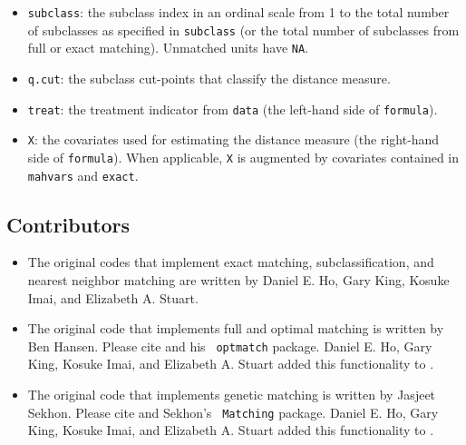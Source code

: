 \begin{itemize}
\item \texttt{subclass}: the subclass index in an ordinal
  scale from 1 to the total number of subclasses as specified in
  \texttt{subclass} (or the total number of subclasses from full or
  exact matching).  Unmatched units have \texttt{NA}.
  
\item \texttt{q.cut}: the subclass cut-points that classify the
  distance measure.
  
\item \texttt{treat}: the treatment indicator from \texttt{data}
  (the left-hand side of \texttt{formula}).
 
\item \texttt{X}: the covariates used for estimating the
  distance measure (the right-hand side of \texttt{formula}).  When
  applicable, \texttt{X} is augmented by covariates contained in
  \texttt{mahvars} and \texttt{exact}. 
\end{itemize}

\subsection{Contributors}

\begin{itemize}
\item The original codes that implement exact matching,
  subclassification, and nearest neighbor matching are written by
  Daniel E. Ho, Gary King, Kosuke Imai, and Elizabeth A. Stuart.
\item The original code that implements full and optimal matching is
  written by Ben Hansen. Please cite \citet{Hansen04} and his {\tt
    optmatch} package.  Daniel E. Ho, Gary King, Kosuke Imai, and
  Elizabeth A. Stuart added this functionality to \MatchIt.
\item The original code that implements genetic matching is written by
  Jasjeet Sekhon. Please cite \citet{DiaSek05} and Sekhon's {\tt
    Matching} package.  Daniel E. Ho, Gary King, Kosuke Imai, and
  Elizabeth A.  Stuart added this functionality to \MatchIt.
\end{itemize}

